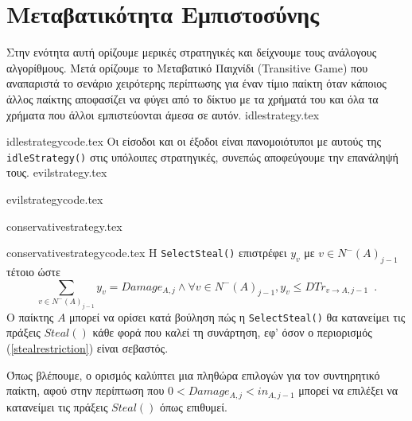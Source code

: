 \section{Μεταβατικότητα Εμπιστοσύνης}
  Στην ενότητα αυτή ορίζουμε μερικές στρατηγικές και δείχνουμε τους ανάλογους αλγορίθμους. Μετά ορίζουμε το Μεταβατικό
  Παιχνίδι (\textlatin{Transitive Game}) που αναπαριστά το σενάριο χειρότερης περίπτωσης για έναν τίμιο παίκτη όταν κάποιος
  άλλος παίκτης αποφασίζει να φύγει από το δίκτυο με τα χρήματά του και όλα τα χρήματα που άλλοι εμπιστεύονται άμεσα σε αυτόν.
  {idlestrategy.tex}

  {idlestrategycode.tex}
  Οι είσοδοι και οι έξοδοι είναι πανομοιότυποι με αυτούς της \texttt{\textlatin{idleStrategy()}} στις υπόλοιπες στρατηγικές,
  συνεπώς αποφεύγουμε την επανάληψή τους.
  {evilstrategy.tex}

  {evilstrategycode.tex}

  {conservativestrategy.tex}

  {conservativestrategycode.tex}
  Η \texttt{\textlatin{SelectSteal()}} επιστρέφει $y_v$ με $v \in N^{-}\left(A\right)_{j-1}$ τέτοιο ώστε
  \begin{equation}
  \label{stealrestriction}
     \sum\limits_{v \in N^{-}\left(A\right)_{j-1}}y_v = Damage_{A, j} \wedge \forall v \in N^{-}\left(A\right)_{j-1},
     y_v \leq DTr_{v \rightarrow A, j-1} \enspace.
  \end{equation}
  Ο παίκτης $A$ μπορεί να ορίσει κατά βούληση πώς η \texttt{\textlatin{SelectSteal()}} θα κατανείμει τις πράξεις
  $Steal\left(\right)$ κάθε φορά που καλεί τη συνάρτηση, εφ' όσον ο περιορισμός (\ref{stealrestriction}) είναι σεβαστός.

  Όπως βλέπουμε, ο ορισμός καλύπτει μια πληθώρα επιλογών για τον συντηρητικό παίκτη, αφού στην περίπτωση που $0 < Damage_{A,j}
  < in_{A,j-1}$ μπορεί να επιλέξει να κατανείμει τις πράξεις $Steal\left(\right)$ όπως επιθυμεί.

